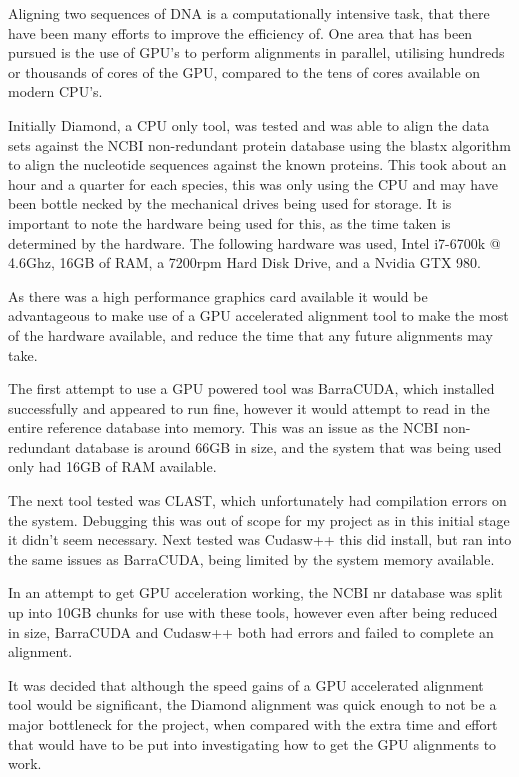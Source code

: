 Aligning two sequences of DNA is a computationally intensive task, that there have been many efforts to improve the efficiency of. One area that has been pursued is the use of GPU's to perform alignments in parallel, utilising hundreds or thousands of cores of the GPU, compared to the tens of cores available on modern CPU's. 

Initially Diamond\cite{diamond}, a CPU only tool, was tested and was able to align the data sets against the NCBI\cite{ncbi} non-redundant protein database\cite{nr} using the blastx algorithm to align the nucleotide sequences against the known proteins. This took about an hour and a quarter for each species, this was only using the CPU and may have been bottle necked by the mechanical drives being used for storage. It is important to note the hardware being used for this, as the time taken is determined by the hardware. The following hardware was used, Intel i7-6700k @ 4.6Ghz, 16GB of RAM, a 7200rpm Hard Disk Drive, and a Nvidia GTX 980. 

As there was a high performance graphics card available it would be advantageous to make use of a GPU accelerated alignment tool to make the most of the hardware available, and reduce the time that any future alignments may take. 

The first attempt to use a GPU powered tool was BarraCUDA\cite{barracuda}, which installed successfully and appeared to run fine, however it would attempt to read in the entire reference database into memory. This was an issue as the NCBI non-redundant database is around 66GB in size, and the system that was being used only had 16GB of RAM available. 

The next tool tested was CLAST\cite{clast}, which unfortunately had compilation errors on the system. Debugging this was out of scope for my project as in this initial stage it didn't seem necessary. Next tested was Cudasw++\cite{cudasw} this did install, but ran into the same issues as BarraCUDA, being limited by the system memory available. 

In an attempt to get GPU acceleration working, the NCBI nr database was split up into 10GB chunks for use with these tools, however even after being reduced in size, BarraCUDA and Cudasw++ both had errors and failed to complete an alignment. 

It was decided that although the speed gains of a GPU accelerated alignment tool would be significant, the Diamond alignment was quick enough to not be a major bottleneck for the project, when compared with the extra time and effort that would have to be put into investigating how to get the GPU alignments to work. 

